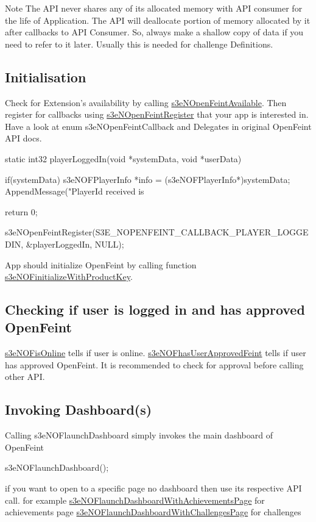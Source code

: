 \begin{DoxyNote}{Note}
The API never shares any of its allocated memory with API consumer for the life of Application. The API will deallocate portion of memory allocated by it after callbacks to API Consumer. So, always make a shallow copy of data if you need to refer to it later. Usually this is needed for challenge Definitions.
\end{DoxyNote}
\hypertarget{index_sec_4_1}{}\subsection{Initialisation}\label{index_sec_4_1}
Check for Extension's availability by calling \hyperlink{group___n_open_feint_api_group_ga6b912a16b413186f3387e8e9a95bcb21}{s3eNOpenFeintAvailable}. Then register for callbacks using \hyperlink{group___n_open_feint_api_group_ga15c3278f021ef1cdbc4f2b522444cc90}{s3eNOpenFeintRegister} that your app is interested in. Have a look at enum s3eNOpenFeintCallback and Delegates in original OpenFeint API docs. 
\begin{DoxyCode}
 static int32 playerLoggedIn(void *systemData, void *userData) 
 {
        if(systemData)
        {
                s3eNOFPlayerInfo *info = (s3eNOFPlayerInfo*)systemData;
                AppendMessage("PlayerId received is %
        }
        
        return 0;
 }
 
 s3eNOpenFeintRegister(S3E_NOPENFEINT_CALLBACK_PLAYER_LOGGEDIN, &playerLoggedIn, 
      NULL);
\end{DoxyCode}


App should initialize OpenFeint by calling function \hyperlink{group___n_open_feint_api_group_gab565578b04e0056a8ce477a9b848a94c}{s3eNOFinitializeWithProductKey}.\hypertarget{index_sec_4_2}{}\subsection{Checking if user is logged in and has approved OpenFeint}\label{index_sec_4_2}
\hyperlink{group___n_open_feint_api_group_ga90b0d5b1df4a437f8c337a61ae7c4678}{s3eNOFisOnline} tells if user is online. \hyperlink{group___n_open_feint_api_group_gaffce9d737cb62d66c7cf64873b1c2aee}{s3eNOFhasUserApprovedFeint} tells if user has approved OpenFeint. It is recommended to check for approval before calling other API.\hypertarget{index_sec_4_3}{}\subsection{Invoking Dashboard(s)}\label{index_sec_4_3}
Calling s3eNOFlaunchDashboard simply invokes the main dashboard of OpenFeint 
\begin{DoxyCode}
                s3eNOFlaunchDashboard();
\end{DoxyCode}
 if you want to open to a specific page no dashboard then use its respective API call. for example \hyperlink{group___n_open_feint_api_group_ga10d29137246b18a6b0aa0f14190eafc8}{s3eNOFlaunchDashboardWithAchievementsPage} for achievements page \hyperlink{group___n_open_feint_api_group_ga298064bb113bc28f0f11dfa88f261ffe}{s3eNOFlaunchDashboardWithChallengesPage} for challenges

